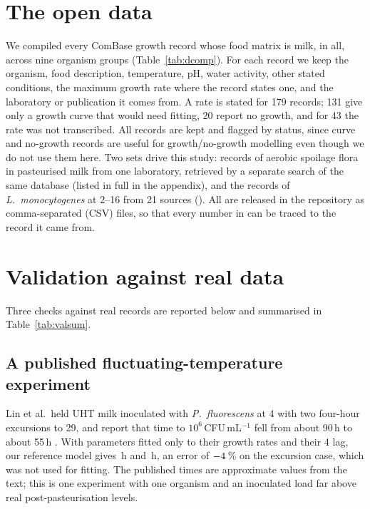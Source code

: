 \section{The open data}\label{sec:data}
We compiled every ComBase growth record whose food matrix is milk, \DatNFull{} in all, across nine organism groups (Table~\ref{tab:dcomp}). For each record we keep the organism, food description, temperature, pH, water activity, other stated conditions, the maximum growth rate where the record states one, and the laboratory or publication it comes from. A rate is stated for 179 records; 131 give only a growth curve that would need fitting, 20 report no growth, and for 43 the rate was not transcribed. All records are kept and flagged by status, since curve and no-growth records are useful for growth/no-growth modelling even though we do not use them here. Two sets drive this study: \DatNSp{} records of aerobic spoilage flora in pasteurised milk from one laboratory, retrieved by a separate search of the same database (listed in full in the appendix), and the \DatNLis{} records of \textit{L.~monocytogenes} at 2--16\degC{} from 21 sources (\ListeriaRef). All are released in the repository as comma-separated (CSV) files, so that every number in  can be traced to the record it came from.

\TabDataComp

\section{Validation against real data}\label{sec:val}
Three checks against real records are reported below and summarised in Table~\ref{tab:valsum}.
\subsection{A published fluctuating-temperature experiment}
Lin et al.\ held UHT milk inoculated with \textit{P.~fluorescens} at 4\degC{} with two four-hour excursions to 29\degC, and report that time to $10^6$\,CFU\,mL$^{-1}$ fell from about 90\,h to about 55\,h \cite{lin2016}. With parameters fitted only to their growth rates and their 4\degC{} lag, our reference model gives \NumLinConst\,h and \NumLinExc\,h, an error of $-4$\,\% on the excursion case, which was not used for fitting. The published times are approximate values from the text; this is one experiment with one organism and an inoculated load far above real post-pasteurisation levels.

